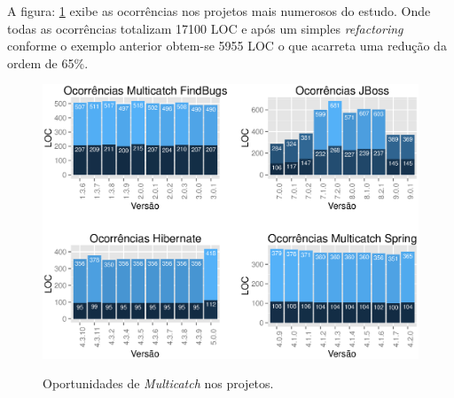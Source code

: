 A figura: \ref{fig:ocorrenciasMulticatchVersoes} exibe as ocorrências nos projetos mais numerosos do estudo. Onde todas as ocorrências totalizam 17100 \acs{LOC} e após um simples \textit{refactoring} conforme o exemplo anterior obtem-se 5955 \acs{LOC} o que acarreta uma redução da ordem de 65\%.\\

\begin{figure}[h]
	\center
	\includegraphics[scale=0.8]{Imagens/ocorrenciasMulticatchVersoes}
	\label{fig:ocorrenciasMulticatchVersoes}
	\caption{Oportunidades de \textit{Multicatch} nos projetos.}
\end{figure}

